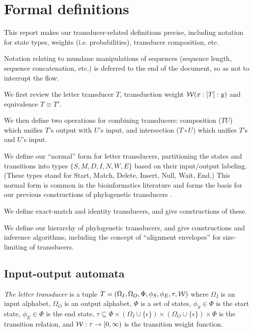 \documentclass{article}
\newcommand{\seclabel}[1]{\label{sec.#1}}
\newcommand\gappedalphabet[1]{(\Omega_{#1} \cup \{\epsilon\})}
\newcommand\wtrans[4]{#1(#2 : [#3] : #4)}
\newcommand\transequiv{\equiv}
\newcommand\compose{}
\newcommand\fork{\circ}
\newcommand\States{\Phi}
\newcommand\Transitions{\tau}
\newcommand\startstate{\phi_S}
\newcommand\laststate{\phi_E}
\newcommand\weight{{\cal W}}
\begin{document}
\pagebreak
\section{Formal definitions}
This report makes our transducer-related definitions precise,
 including notation for state types, weights (i.e. probabilities),
 transducer composition, etc.

Notation relating to mundane manipulations of sequences (sequence length, sequence concatenation, etc.) is deferred to the end of the document,
 so as not to interrupt the flow.

We first review the letter transducer $T$,
 transduction weight $\wtrans{\weight}{x}{T}{y}$ and
 equivalence $T \transequiv T'$.

We then define two operations for combining transducers:
 composition ($T \compose U$) which unifies $T$'s output with $U$'s input,
and
 intersection ($T \fork U$) which unifies $T$'s and $U$'s input.

We define our ``normal'' form for letter transducers,
 partitioning the states and transitions into types $\{S,M,D,I,N,W,E\}$ based on their input/output labeling.
(These types stand for Start, Match, Delete, Insert, Null, Wait, End.)
This normal form is common in the bioinformatics literature \cite{Durbin98}
 and forms the basis for our previous constructions of phylogenetic transducers \cite{Holmes2003,BradleyHolmes2009}.

We define exact-match and identity transducers, and give constructions of these.

We define our hierarchy of phylogenetic transducers, and give constructions and inference algorithms,
including the concept of ``alignment envelopes'' for size-limiting of transducers.

\subsection{Input-output automata}
\seclabel{Transducer}
{\em The letter transducer} is a tuple $T = (\Omega_I, \Omega_O, \States, \startstate, \laststate, \Transitions, \weight)$
where
 $\Omega_I$ is an input alphabet,
 $\Omega_O$ is an output alphabet,
$\States$ is a set of states,
$\startstate \in \States$ is the start state,
$\laststate \in \States$ is the end state,
$\Transitions \subseteq \States \times \gappedalphabet{I} \times \gappedalphabet{O} \times \States$ is the transition relation, and
$\weight:\Transitions \to [0,\infty)$ is the transition weight function.
\end{document}
